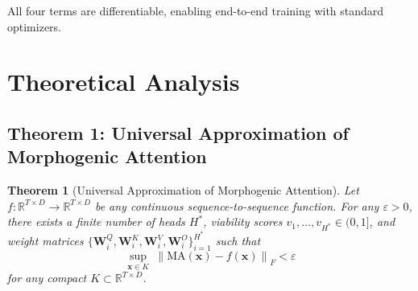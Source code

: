 \documentclass[11pt,a4paper]{article}
\theoremstyle{plain}
\newtheorem{theorem}{Theorem}
\theoremstyle{definition}
\theoremstyle{remark}
\newcommand{\R}{\mathbb{R}}
\newcommand{\norm}[1]{\left\lVert #1 \right\rVert}
\begin{document}
All four terms are differentiable, enabling end-to-end training with standard optimizers.

\section{Theoretical Analysis}
\label{sec:theory}

\subsection{Theorem 1: Universal Approximation of Morphogenic Attention}

\begin{theorem}[Universal Approximation of Morphogenic Attention]
Let $f: \R^{T \times D} \to \R^{T \times D}$ be any continuous sequence-to-sequence function. For any $\varepsilon > 0$, there exists a finite number of heads $H^*$, viability scores $v_1,\ldots,v_{H^*} \in (0,1]$, and weight matrices $\{\mathbf{W}_i^Q, \mathbf{W}_i^K, \mathbf{W}_i^V, \mathbf{W}_i^O\}_{i=1}^{H^*}$ such that
\[
  \sup_{\mathbf{x} \in K}\; \norm{\text{MA}(\mathbf{x}) - f(\mathbf{x})}_F < \varepsilon
\]
for any compact $K \subset \R^{T \times D}$.
\end{theorem}
\end{document}
